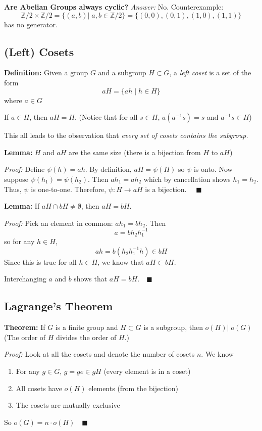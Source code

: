 \documentclass[12pt]{report}
\newcommand{\qed}{\quad \blacksquare}
\newcommand{\Z}{\mathbb{Z}}
\begin{document}
\textbf{Are Abelian Groups always cyclic?}
\emph{Answer:} No. Counterexample:
\[\Z/2 \times \Z/2 = \{(a, b) | \; a, b \in \Z/2\} = \{(0,0), (0, 1), (1, 0), (1,1)\}\]
has no generator. 

\subsection*{(Left) Cosets}
\textbf{Definition:} Given a group $G$ and a subgroup $H \subset G$, a \emph{left coset} is a set of the form 
\[aH = \{ah\; | \; h \in H\}\]
where $a \in G$

If $a \in H$, then $aH = H$. 
(Notice that for all $s \in H$, $a(a^{-1}s) = s$ and $a^{-1}s \in H$)

This all leads to the observation that \emph{every set of cosets contains the subgroup.}

\textbf{Lemma:} $H$ and $aH$ are the same size (there is a bijection from $H$ to $aH$)

\emph{Proof:} Define $\psi(h) = ah$. By definition, $aH = \psi(H)$ so $\psi$ is onto. Now suppose $\psi(h_1) = \psi(h_2)$. Then $ah_1 = ah_2$ which by cancellation shows $h_1 = h_2$. Thus, $\psi$ is one-to-one. Therefore, $\psi: H \to aH$ is a bijection. $\qed$

\textbf{Lemma:} If $aH \cap bH \neq \emptyset$, then $aH = bH$.

\emph{Proof:} Pick an element in common: $ah_1 = bh_2$. Then 
\[a = bh_2h_1^{-1}\]
so for any $h\in H$,
\[ah = b(h_2 h_1^{-1}h) \in bH\]
Since this is true for all $h \in H$, we know that $aH \subset bH$. 

Interchanging $a$ and $b$ shows that $aH = bH. \qed$

\subsection*{Lagrange's Theorem}
\textbf{Theorem:} If $G$ is a finite group and $H \subset G$ is a subgroup, then $o(H) |\; o(G)$ (The order of $H$ divides the order of $H$.) 

\emph{Proof:} Look at all the cosets and denote the number of cosets $n$. We know
\begin{enumerate}
    \item For any $g\in G$, $g=ge \in gH$ (every element is in a coset)
    \item All cosets have $o(H)$ elements (from the bijection)
    \item The cosets are mutually exclusive
\end{enumerate}
So $o(G) = n \cdot o(H) \qed$
\end{document}
